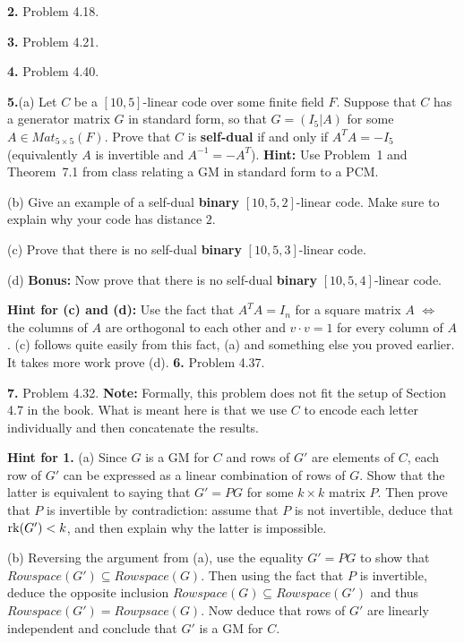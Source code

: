 \documentclass[12pt]{amsart}
\begin{document}
{\bf 2.} Problem 4.18.
\skv

{\bf 3.} Problem 4.21.
\skv

{\bf 4.} Problem 4.40.
\skv

{\bf 5.}(a) Let $C$ be a $[10,5]$-linear code over some finite field $F$. Suppose that $C$ has a generator matrix $G$ in standard form, so that
$G=(I_5 | A)$ for some $A\in Mat_{5\times 5}(F)$. Prove that $C$ is {\bf self-dual} if and only if $A^{T}A=-I_5$ (equivalently $A$ is invertible and $A^{-1}=-A^T$). {\bf Hint:} Use Problem~1 and Theorem~7.1 from class
relating a GM in standard form to a PCM. 
\skv

(b) Give an example of a self-dual {\bf binary} $[10,5,2]$-linear code. Make sure to explain why your code has distance $2$.
\skv

(c) Prove that there is no self-dual {\bf binary} $[10,5,3]$-linear code.
\skv

(d) {\bf Bonus:} Now prove that there is no self-dual {\bf binary} $[10,5,4]$-linear code. 
\skv

{\bf Hint for (c) and (d):} Use the fact that $A^T A=I_n$ for a square matrix $A$ 
$\iff$ the columns of $A$ are orthogonal to each other and $v\cdot v=1$ for every column of $A$. (c) follows quite easily from this fact, (a) and something else you proved earlier. It takes more work prove (d).
\skv
{\bf 6.} Problem 4.37. 
\skv

{\bf 7.} Problem 4.32. {\bf Note:} Formally, this problem does not fit the setup of Section 4.7 in the book. What is meant here is that we use $C$ to encode each letter individually and then concatenate the results.
\skv

\newpage
{\bf Hint for 1.} (a) Since $G$ is a GM for $C$ and rows of $G'$ are elements of $C$, each row of $G'$ can be expressed as a linear combination of rows of $G$. Show that the latter is equivalent to saying that $G'=PG$ for some $k\times k$
matrix $P$. Then prove that $P$ is invertible by contradiction: assume that $P$ is not invertible, deduce that 
${\rm rk}(G')<k$, and then explain why the latter is impossible.

(b) Reversing the argument from (a), use the equality $G'=PG$ to show that $Rowspace(G')\subseteq Rowspace(G)$. Then using the fact that $P$ is invertible, deduce the opposite inclusion $Rowspace(G)\subseteq Rowspace(G')$ and thus
$Rowspace(G')=Rowpsace(G)$. Now deduce that rows of $G'$ are linearly independent and conclude that $G'$ is a GM for $C$.
\end{document}
